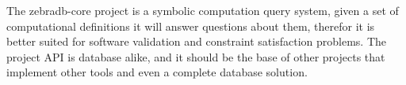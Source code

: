 \documentclass{article}
\begin{document}
The zebradb-core project is a symbolic computation query system, given a set of computational definitions it will answer questions about them, therefor it is better suited for software validation and constraint satisfaction problems.
The project API is database alike, and it should be the base of other projects that implement other tools and even a complete database solution.
\end{document}
